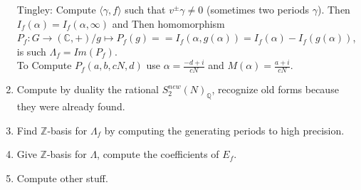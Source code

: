 \documentclass{article}
\newcommand{\Q}{\mathbb{Q}}
\newcommand{\C}{\mathbb{C}}
\newcommand{\Z}{\mathbb{Z}}
\newcommand{\ra}{\rightarrow}
\begin{document}
\begin{multicols}{2}
\begin{enumerate}
Tingley: Compute $\langle \gamma,f\rangle$ such that $v^\pm \gamma \neq 0$ (sometimes two periods $\gamma$). Then $I_f(\alpha) = I_f(\alpha,\infty)$ and  Then homomorphism $P_f: G \ra (\C,+)/ g \mapsto P_f(g) = = I_f(\alpha,g(\alpha)) = I_f(\alpha) - I_f(g(\alpha))$, is such $\Lambda_f = Im(P_f)$.\\

To Compute $P_f(a,b,cN,d)$ use $\alpha = \frac{-d+i}{cN}$ and $M(\alpha) = \frac{a+i}{cN}$. 






\item Compute by duality the rational $S_2^{new}(N)_\Q$, recognize old forms because they were already found.
\item Find $\Z$-basis for $\Lambda_f$ by computing the generating periods to high precision. 
\item Give $\Z$-basis for $\Lambda$, compute the coefficients of $E_f$.
\item Compute other stuff. 

\end{enumerate}
\end{multicols}
\end{document}
